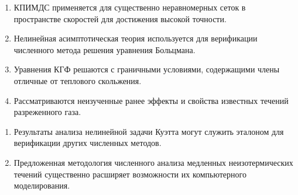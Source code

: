 {\novelty}
\begin{enumerate}
    \item КПИМДС применяется для существенно неравномерных сеток в пространстве скоростей для достижения высокой точности. %
    \item Нелинейная асимптотическая теория используется для верификации численного метода решения уравнения Больцмана. %
    \item Уравнения КГФ решаются с граничными условиями, содержащими члены отличные от теплового скольжения. %
    \item Рассматриваются неизученные ранее эффекты и свойства известных течений разреженного газа. %
\end{enumerate}

{\influence}
\begin{enumerate}
    \item Результаты анализа нелинейной задачи Куэтта могут служить эталоном
    для верификации других численных методов.
    \item Предложенная методология численного анализа медленных неизотермических течений
    существенно расширяет возможности их компьютерного моделирования.
\end{enumerate}

